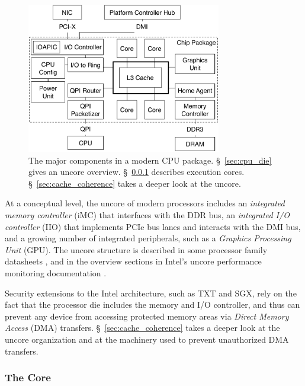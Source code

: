 \begin{figure}[hbt]
  \centering
  \includegraphics[width=85mm]{figures/cpu_die.pdf}
  \caption{
    The major components in a modern CPU package. \S~\ref{sec:cpu_die} gives
    an uncore overview. \S~\ref{sec:cpu_core} describes execution cores.
    \S~\ref{sec:cache_coherence} takes a deeper look at the uncore.
  }
  \label{fig:cpu_die}
\end{figure}


At a conceptual level, the uncore of modern processors includes an
\textit{integrated memory controller} (iMC) that interfaces with the DDR bus,
an \textit{integrated I/O controller} (IIO) that implements PCIe bus lanes and
interacts with the DMI bus, and a growing number of integrated peripherals,
such as a \textit{Graphics Processing Unit} (GPU). The uncore structure is
described in some processor family datasheets \cite{intel2014datasheet,
intel2010datasheet}, and in the overview sections in Intel's uncore performance
monitoring documentation \cite{intel2014uncore, intel2012uncore,
intel2010uncore}.

Security extensions to the Intel architecture, such as TXT and SGX, rely on the
fact that the processor die includes the memory and I/O controller, and thus
can prevent any device from accessing protected memory areas via
\textit{Direct Memory Access} (DMA) transfers. \S~\ref{sec:cache_coherence}
takes a deeper look at the uncore organization and at the machinery used to
prevent unauthorized DMA transfers.


\subsubsection{The Core}
\label{sec:cpu_core}

